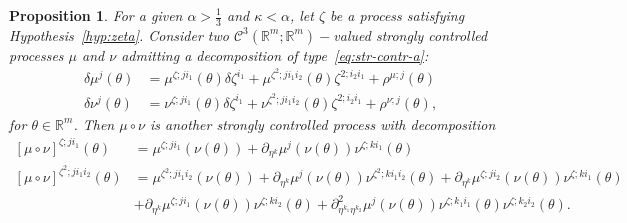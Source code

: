 \documentclass[12pt,reqno]{amsart}
\numberwithin{equation}{section}  %
\newcommand{\der}{\delta}
\newcommand{\pt}{\partial}
\newcommand{\1}{{\bf 1}}
\newcommand{\2}{{\bf 2}}
\newcommand{\bzeta}{{\zeta}}
\newcommand{\R}{\mathbb R}
\newcommand{\cac}{\mathcal C}
\newcommand{\al}{\alpha}
\newcommand{\ka}{\kappa}
\newcommand{\lc}{\left[}
\newcommand{\rc}{\right]}
\newtheorem{proposition}[theorem]{Proposition}
\theoremstyle{remark}
\theoremstyle{remark}
\begin{document}
\begin{proposition}\label{prop:str_comp}
For a given $\al > \frac{1}{3}$ and $\ka < \al$, let $\bzeta$ be a process satisfying Hypothesis~\ref{hyp:zeta}. Consider two $\cac^3(\R^m;\R^m)-$valued strongly controlled processes $\mu$ and $\nu$ admitting a decomposition of type~\eqref{eq:str-contr-a}:
\begin{align}\label{eq:mu_nu_str}
\der \mu^j(\theta) &= \mu^{\bzeta; j i_1}(\theta) \der \bzeta^{i_1} + \mu^{\bzeta^2; ji_1 i_2}(\theta) \bzeta^{2;i_2 i_1} + \rho^{\mu;j}(\theta) \nonumber\\
\der \nu^j(\theta) &= \nu^{\bzeta;ji_1}(\theta) \der \bzeta^{i_1} + \nu^{\bzeta^2; ji_1 i_2}(\theta) \bzeta^{2; i_2 i_1} + \rho^{\nu; j}(\theta),
\end{align}
for $\theta \in \R^m$. Then $\mu \circ \nu$ is another strongly controlled process with decomposition 
\begin{align}
{\lc \mu \circ \nu \rc}^{\bzeta; j i_1}(\theta) &= \mu^{\bzeta; j i_1}(\nu(\theta)) + \pt_{\eta^k} \mu^j(\nu(\theta)) \nu^{\bzeta; ki_1}(\theta) \label{eq:mu_nu_str_decomp-i}\\
{\lc \mu \circ \nu \rc}^{\bzeta^2; j i_1 i_2} (\theta) &= \mu^{\bzeta^2; j i_1 i_2}(\nu(\theta)) + \pt_{\eta^k} \mu^j(\nu(\theta)) \nu^{\bzeta^2; k i_1 i_2}(\theta) + \pt_{\eta^k} \mu^{\bzeta; j i_2}(\nu(\theta)) \nu^{\bzeta; k i_1}(\theta)\nonumber \\ 
&+ \pt_{\eta^k} \mu^{\bzeta; j i_1}(\nu(\theta)) \nu^{\bzeta; k i_2}(\theta) 
+\pt_{\eta^{k_1} \eta^{k_2}}^2 \mu^j (\nu(\theta)) \nu^{\bzeta; k_1 i_1}(\theta) \nu^{\bzeta; k_2 i_2}(\theta) \label{eq:mu_nu_str_decomp-ii}.
\end{align}
\end{proposition}
\end{document}
